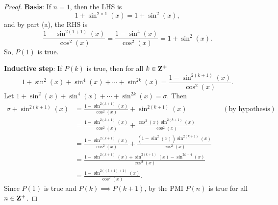 \begin{parts}
\begin{EnvFullwidth}
\begin{solutionorgrid}[6.5in]
\begin{proof}
\textbf{Basis}: If $n = 1$, then the LHS is
\[
	1 + \sin^{2 \times 1}(x) = 1 + \sin^2(x),
\]
and by part (a), the RHS is
\[
	\frac{1 - \sin^{2(1 + 1)}(x)}{\cos^2(x)} = \frac{1 - \sin^4(x)}{\cos^2(x)} = 1 + \sin^2(x).
\]
So, $P(1)$ is true.

\textbf{Inductive step}: If $P(k)$ is true, then for all $k \in \mathbf{Z}^+$
\[
	1 + \sin^2(x) + \sin^4(x) + \cdots + \sin^{2k}(x) = \frac{1 - \sin^{2(k + 1)}(x)}{\cos^2(x)}.
\]
Let $1 + \sin^2(x) + \sin^4(x) + \cdots + \sin^{2k}(x) = \sigma$. Then
\begin{align*}
	\sigma + \sin^{2(k + 1)}(x) &= \frac{1 - \sin^{2(k + 1)}(x)}{\cos^2(x)} + \sin^{2(k + 1)}(x) && (\textrm{by hypothesis}) \\
	&= \frac{1 - \sin^{2(k + 1)}(x)}{\cos^2(x)} + \frac{\cos^2(x) \sin^{2(k + 1)}(x)}{\cos^2(x)} \\
	&= \frac{1 - \sin^{2(k + 1)}(x)}{\cos^2(x)} + \frac{(1 - \sin^2(x)) \sin^{2(k + 1)}(x)}{\cos^2(x)} \\
	&= \frac{1 - \sin^{2(k + 1)}(x) + \sin^{2(k + 1)}(x) - \sin^{2k + 4}(x)}{\cos^2(x)} \\
	&= \frac{1 - \sin^{2((k + 1) + 1)}(x)}{\cos^2(x)}.
\end{align*}
Since $P(1)$ is true and $P(k) \implies P(k + 1)$, by the PMI $P(n)$ is true for all $n \in \mathbf{Z}^+$.
\end{proof}
\end{solutionorgrid}
\end{EnvFullwidth}

\end{parts}
